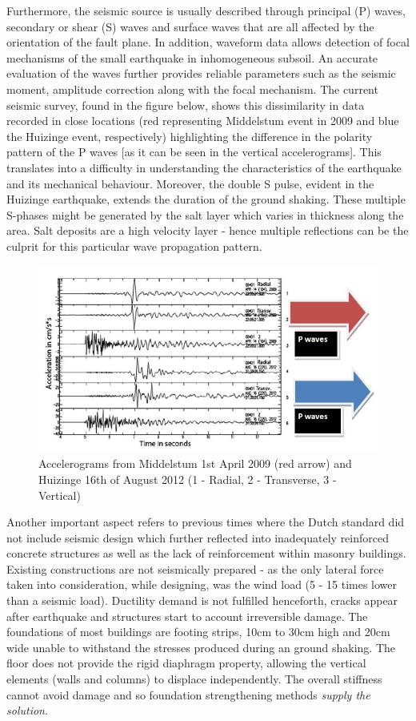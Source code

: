 \documentclass[11pt,a4paper]{report}
\begin{document}
Furthermore, the seismic source is usually described through principal (P) waves, secondary or shear (S) waves and surface waves that are all affected by the orientation of the fault plane. In addition, waveform data allows detection of focal mechanisms of the small earthquake in inhomogeneous subsoil. An accurate evaluation of the waves further provides reliable parameters such as the seismic moment, amplitude correction along with the focal mechanism. The current seismic survey, found in the figure below, shows this dissimilarity in data recorded in close locations (red representing Middelstum event in 2009 and blue the Huizinge event, respectively) highlighting the difference in the polarity pattern of the P waves [as it can be seen in the vertical accelerograms]. This translates into a difficulty in understanding  the characteristics of the earthquake and its mechanical behaviour. Moreover, the double S pulse, evident in the Huizinge earthquake, extends the duration of the ground shaking. These multiple S-phases might be generated by the salt layer which varies in thickness along the area. Salt deposits are a high velocity layer - hence multiple reflections can be the culprit for this particular wave propagation pattern. 

\begin{figure}[h!]
	\centering
	\includegraphics[width=0.7\linewidth]{"Pwaves"}
	\caption[]{Accelerograms from Middelstum 1st April 2009 (red arrow) and Huizinge 16th of August 2012 (1 - Radial, 2 - Transverse, 3 - Vertical)}
	\label{Pwaves}
\end{figure}

Another important aspect refers to previous times where the Dutch standard did not include seismic design which further reflected into inadequately reinforced concrete structures as well as the lack of reinforcement within masonry buildings. Existing constructions are not seismically prepared - as the only lateral force taken into consideration, while designing, was the wind load (5 - 15 times lower than a seismic load). Ductility demand is not fulfilled henceforth, cracks appear after earthquake and structures start to account irreversible damage.  The foundations of most buildings are footing strips, 10cm to 30cm high and 20cm wide unable to withstand the stresses produced during an ground shaking. The floor does not provide the rigid diaphragm property, allowing the vertical elements (walls and columns) to displace independently. The overall stiffness cannot avoid damage and so foundation strengthening methods \textit{supply the solution}. 
\end{document}
